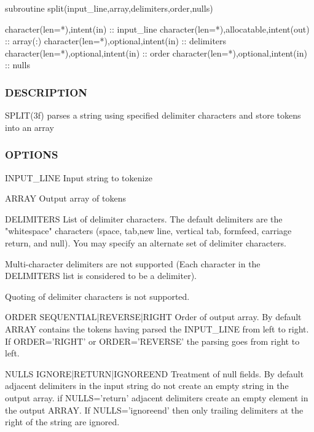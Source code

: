 \begin{DoxyVerb}subroutine split(input_line,array,delimiters,order,nulls)

 character(len=*),intent(in)              :: input_line
 character(len=*),allocatable,intent(out) :: array(:)
 character(len=*),optional,intent(in)     :: delimiters
 character(len=*),optional,intent(in)     :: order
 character(len=*),optional,intent(in)     :: nulls
\end{DoxyVerb}


\subsubsection*{D\+E\+S\+C\+R\+I\+P\+T\+I\+ON}

S\+P\+L\+I\+T(3f) parses a string using specified delimiter characters and store tokens into an array

\subsubsection*{O\+P\+T\+I\+O\+NS}

\begin{DoxyVerb}INPUT_LINE  Input string to tokenize

ARRAY       Output array of tokens

DELIMITERS  List of delimiter characters.
            The default delimiters are the "whitespace" characters
            (space, tab,new line, vertical tab, formfeed, carriage
            return, and null). You may specify an alternate set of
            delimiter characters.

            Multi-character delimiters are not supported (Each
            character in the DELIMITERS list is considered to be
            a delimiter).

            Quoting of delimiter characters is not supported.

ORDER SEQUENTIAL|REVERSE|RIGHT  Order of output array.
            By default ARRAY contains the tokens having parsed
            the INPUT_LINE from left to right. If ORDER='RIGHT'
            or ORDER='REVERSE' the parsing goes from right to left.

NULLS IGNORE|RETURN|IGNOREEND  Treatment of null fields.
            By default adjacent delimiters in the input string
            do not create an empty string in the output array. if
            NULLS='return' adjacent delimiters create an empty element
            in the output ARRAY. If NULLS='ignoreend' then only
            trailing delimiters at the right of the string are ignored.
\end{DoxyVerb}


